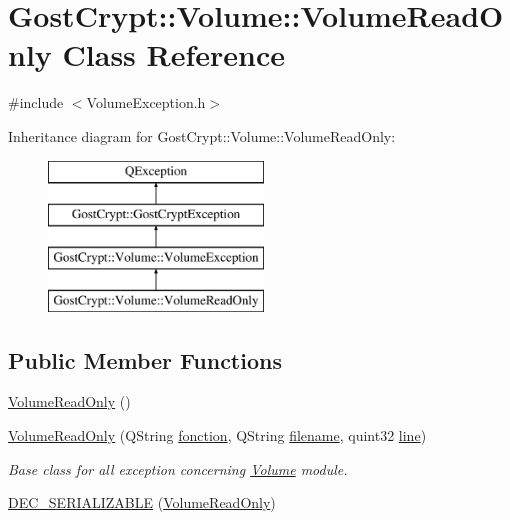 \hypertarget{class_gost_crypt_1_1_volume_1_1_volume_read_only}{}\section{Gost\+Crypt\+:\+:Volume\+:\+:Volume\+Read\+Only Class Reference}
\label{class_gost_crypt_1_1_volume_1_1_volume_read_only}


{\ttfamily \#include $<$Volume\+Exception.\+h$>$}

Inheritance diagram for Gost\+Crypt\+:\+:Volume\+:\+:Volume\+Read\+Only\+:\begin{figure}[H]
\begin{center}
\leavevmode
\includegraphics[height=4.000000cm]{class_gost_crypt_1_1_volume_1_1_volume_read_only}
\end{center}
\end{figure}
\subsection*{Public Member Functions}
\begin{DoxyCompactItemize}
\item 
\hyperlink{class_gost_crypt_1_1_volume_1_1_volume_read_only_ac423cd67478ffd7d4142750247a6e98c}{Volume\+Read\+Only} ()
\item 
\hyperlink{class_gost_crypt_1_1_volume_1_1_volume_read_only_a3a0c0bd15784843d2adef65adf2cc871}{Volume\+Read\+Only} (Q\+String \hyperlink{class_gost_crypt_1_1_gost_crypt_exception_a29b8c93d5efbb1ff369107385725a939}{fonction}, Q\+String \hyperlink{class_gost_crypt_1_1_gost_crypt_exception_a749a12375f4ba9d502623b99d8252f38}{filename}, quint32 \hyperlink{class_gost_crypt_1_1_gost_crypt_exception_abf506d911f12a4e969eea500f90bd32c}{line})
\begin{DoxyCompactList}\small\item\em Base class for all exception concerning \hyperlink{class_gost_crypt_1_1_volume_1_1_volume}{Volume} module. \end{DoxyCompactList}\item 
\hyperlink{class_gost_crypt_1_1_volume_1_1_volume_read_only_aa42baf4b62d1e2fad7cc4bafb2336eb0}{D\+E\+C\+\_\+\+S\+E\+R\+I\+A\+L\+I\+Z\+A\+B\+LE} (\hyperlink{class_gost_crypt_1_1_volume_1_1_volume_read_only}{Volume\+Read\+Only})
\end{DoxyCompactItemize}
